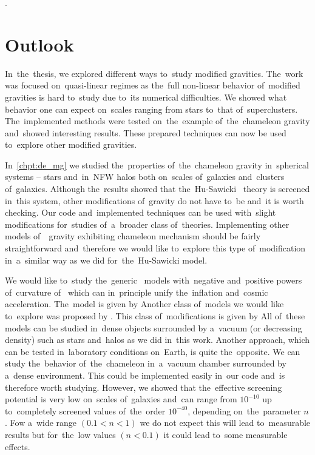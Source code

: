 \DIFdelend .\clearpage{}
\clearpage{}\chapter{Outlook}
\label{chpt:outlook}
In~the~thesis, we explored different ways to~study modified gravities. The~work was focused on~quasi-linear regimes as the~full non-linear behavior of~modified gravities is hard to~study due to~its numerical difficulties. We showed what behavior one can expect on~scales ranging from stars to~that of~superclusters. The~implemented methods were tested on~the~example of~the~chameleon gravity and~showed interesting results. These prepared techniques can now be used to~explore other modified gravities.

In~\autoref{chpt:de_mg} we studied the~properties of~the~chameleon gravity in~spherical systems -- stars and~in~NFW halos both on~scales of~galaxies and~clusters of~galaxies. Although the~results showed that the~Hu-Sawicki \fR\ theory is screened in~this system, other modifications of~gravity do not have to~be and~it is worth checking. Our code and~implemented techniques can be used with~slight modifications for~studies of~a~broader class of~theories. Implementing other models of~\fR\ gravity exhibiting chameleon mechanism should be fairly straightforward and~therefore we would like to~explore this type of~modification in~a~similar way as we did for~the~Hu-Sawicki model.

We would like to~study the~generic \fR\ models with~negative and~positive powers of~curvature of~\textcite{2003PhRvD..68l3512N} which can in~principle unify the~inflation and~cosmic acceleration. The~model is given by
Another class of~models we would like to~explore was proposed by \textcite{2007JETPL..86..157S}. This class of~modifications is given by
All of~these models can be studied in~dense objects surrounded by a~vacuum (or decreasing density) such as stars and~halos as we did in~this work. Another approach, which can be tested in~laboratory conditions on~Earth, is quite the~opposite. We can study the~behavior of~the~chameleon in~a~vacuum chamber surrounded by a~dense environment. This could be implemented easily in~our code and~is therefore worth studying. However, we showed that the~effective screening potential is very low on~scales of~galaxies and~can range from $10^{-10}$ up to~completely screened values of~the~order $10^{-40}$, depending on~the~parameter $n$. Fow a~wide range $(0.1 < n < 1)$ we do not expect this will lead to~measurable results but for~the~low values $(n < 0.1)$ it could lead to~some measurable effects.

